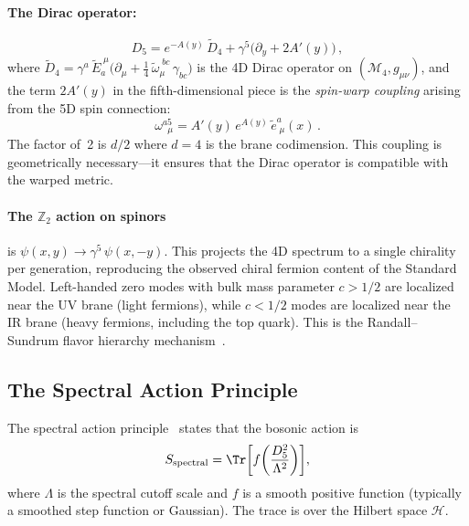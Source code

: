 \paragraph{The Dirac operator:}
\begin{equation}
\label{eq:1-dirac}
D_5 = e^{-A(y)}\, \tilde{D}_4 + \gamma^5\bigl(\partial_y + 2A'(y)\bigr)\,,
\end{equation}
where $\tilde{D}_4 = \gamma^a\, \tilde{E}_a^{\;\mu}\bigl(\partial_\mu + \tfrac{1}{4}\, \tilde{\omega}_\mu^{\;bc}\, \gamma_{bc}\bigr)$ is the 4D Dirac operator on $(\mathcal{M}_4, g_{\mu\nu})$, and the term $2A'(y)$ in the fifth-dimensional piece is the \emph{spin-warp coupling} arising from the 5D spin connection:
\begin{equation}
\label{eq:1-spin-connection}
\omega^{a5}_{\;\;\mu} = A'(y)\, e^{A(y)}\, \tilde{e}^a_{\;\mu}(x)\,.
\end{equation}
The factor of~2 is $d/2$ where $d = 4$ is the brane codimension. This coupling is geometrically necessary---it ensures that the Dirac operator is compatible with the warped metric.

\paragraph{The $\mathbb{Z}_2$ action on spinors} is $\psi(x,y) \to \gamma^5\, \psi(x,-y)$. This projects the 4D spectrum to a single chirality per generation, reproducing the observed chiral fermion content of the Standard Model. Left-handed zero modes with bulk mass parameter $c > 1/2$ are localized near the UV brane (light fermions), while $c < 1/2$ modes are localized near the IR brane (heavy fermions, including the top quark). This is the Randall--Sundrum flavor hierarchy mechanism~\cite{ch1:grossman-neubert}.

\subsection{The Spectral Action Principle}
\label{sec:1-spectral-action}

The spectral action principle~\cite{ch1:chamseddine97} states that the bosonic action is
\begin{equation}
\label{eq:1-spectral-action}
S_{\mathrm{spectral}} = \Tr\!\left[f\!\left(\frac{D_5^2}{\Lambda^2}\right)\right]\!,
\end{equation}
where $\Lambda$ is the spectral cutoff scale and $f$ is a smooth positive function (typically a smoothed step function or Gaussian). The trace is over the Hilbert space $\mathcal{H}$.

